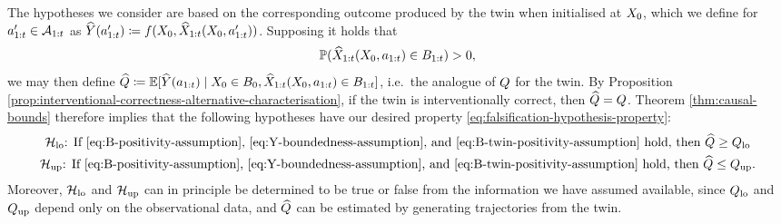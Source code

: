 The hypotheses we consider are based on the corresponding outcome produced by the twin when initialised at $X_0$, which we define for $a_{1:t}' \in \mathcal{A}_{1:t}$ as $\widehat{Y}(a_{1:t}') \coloneqq f(X_0, \widehat{X}_{1:t}(X_0, a_{1:t}'))$.
Supposing it holds that
\begin{equation} \label{eq:B-twin-positivity-assumption}
    \mathbb{P}(\widehat{X}_{1:t}(X_0, a_{1:t}) \in B_{1:t}) > 0,
\end{equation}
we may then define
$\widehat{Q} \coloneqq \mathbb{E}[\widehat{Y}(a_{1:t}) \mid X_0 \in B_0, \widehat{X}_{1:t}(X_0, a_{1:t}) \in B_{1:t}]$, i.e.\
the analogue of $Q$ for the twin.
By Proposition \ref{prop:interventional-correctness-alternative-characterisation}, if the twin is interventionally correct, then $\widehat{Q} = Q$.
Theorem \ref{thm:causal-bounds} therefore implies that the following hypotheses have our desired property \eqref{eq:falsification-hypothesis-property}:
\begin{gather*}
\text{$\mathcal{H}_{\mathrm{lo}}$: If \eqref{eq:B-positivity-assumption}, \eqref{eq:Y-boundedness-assumption}, and \eqref{eq:B-twin-positivity-assumption} hold, then $\widehat{Q} \geq Q_{\mathrm{lo}}$} \\
\text{$\mathcal{H}_{\mathrm{up}}$: If \eqref{eq:B-positivity-assumption}, \eqref{eq:Y-boundedness-assumption}, and \eqref{eq:B-twin-positivity-assumption} hold, then $\widehat{Q} \leq Q_{\mathrm{up}}$.}
\end{gather*}
Moreover, $\mathcal{H}_{\mathrm{lo}}$ and $\mathcal{H}_{\mathrm{up}}$ can in principle be determined to be true or false from the information we have assumed available, since $Q_{\mathrm{lo}}$ and $Q_{\mathrm{up}}$ depend only on the observational data, and $\widehat{Q}$ can be estimated by generating trajectories from the twin.






